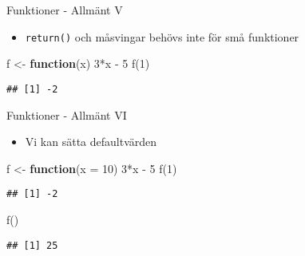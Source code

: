 \documentclass[
  11pt,
  ignorenonframetext,
]{beamer}
\newenvironment{Shaded}{\begin{snugshade}}{\end{snugshade}}
\newcommand{\AttributeTok}[1]{\textcolor[rgb]{0.77,0.63,0.00}{#1}}
\newcommand{\ControlFlowTok}[1]{\textcolor[rgb]{0.13,0.29,0.53}{\textbf{#1}}}
\newcommand{\DecValTok}[1]{\textcolor[rgb]{0.00,0.00,0.81}{#1}}
\newcommand{\FunctionTok}[1]{\textcolor[rgb]{0.00,0.00,0.00}{#1}}
\newcommand{\NormalTok}[1]{#1}
\newcommand{\OtherTok}[1]{\textcolor[rgb]{0.56,0.35,0.01}{#1}}
\newcommand{\SpecialCharTok}[1]{\textcolor[rgb]{0.00,0.00,0.00}{#1}}
\providecommand{\tightlist}{%
  \setlength{\itemsep}{0pt}\setlength{\parskip}{0pt}}
\begin{document}
\begin{frame}[fragile]{Funktioner - Allmänt V}
\protect\hypertarget{funktioner---allmuxe4nt-v}{}
\begin{itemize}
\tightlist
\item
  \texttt{return()} och måsvingar behövs inte för små funktioner
\end{itemize}

\begin{Shaded}
\begin{Highlighting}[]
\NormalTok{f }\OtherTok{\textless{}{-}} \ControlFlowTok{function}\NormalTok{(x) }\DecValTok{3}\SpecialCharTok{*}\NormalTok{x }\SpecialCharTok{{-}} \DecValTok{5}
\FunctionTok{f}\NormalTok{(}\DecValTok{1}\NormalTok{)}
\end{Highlighting}
\end{Shaded}

\begin{verbatim}
## [1] -2
\end{verbatim}
\end{frame}

\begin{frame}[fragile]{Funktioner - Allmänt VI}
\protect\hypertarget{funktioner---allmuxe4nt-vi}{}
\begin{itemize}
\tightlist
\item
  Vi kan sätta defaultvärden
\end{itemize}

\begin{Shaded}
\begin{Highlighting}[]
\NormalTok{f }\OtherTok{\textless{}{-}} \ControlFlowTok{function}\NormalTok{(}\AttributeTok{x =} \DecValTok{10}\NormalTok{) }\DecValTok{3}\SpecialCharTok{*}\NormalTok{x }\SpecialCharTok{{-}} \DecValTok{5}
\FunctionTok{f}\NormalTok{(}\DecValTok{1}\NormalTok{)}
\end{Highlighting}
\end{Shaded}

\begin{verbatim}
## [1] -2
\end{verbatim}

\begin{Shaded}
\begin{Highlighting}[]
\FunctionTok{f}\NormalTok{()}
\end{Highlighting}
\end{Shaded}

\begin{verbatim}
## [1] 25
\end{verbatim}
\end{frame}
\end{document}
